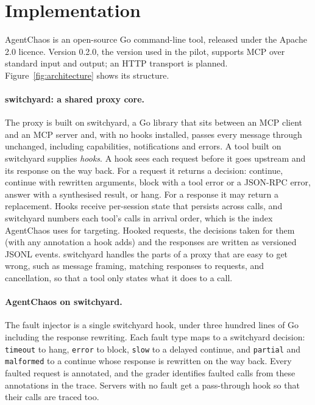\section{Implementation}\label{sec:implementation}

AgentChaos is an open-source Go command-line tool, released under the Apache 2.0 licence. Version 0.2.0, the version used in the pilot, supports MCP over standard input and output; an HTTP transport is planned. Figure~\ref{fig:architecture} shows its structure.



\paragraph{switchyard: a shared proxy core.} The proxy is built on switchyard, a Go library that sits between an MCP client and an MCP server and, with no hooks installed, passes every message through unchanged, including capabilities, notifications and errors. A tool built on switchyard supplies \emph{hooks}. A hook sees each request before it goes upstream and its response on the way back. For a request it returns a decision: continue, continue with rewritten arguments, block with a tool error or a JSON-RPC error, answer with a synthesised result, or hang. For a response it may return a replacement. Hooks receive per-session state that persists across calls, and switchyard numbers each tool's calls in arrival order, which is the index AgentChaos uses for targeting. Hooked requests, the decisions taken for them (with any annotation a hook adds) and the responses are written as versioned JSONL events. switchyard handles the parts of a proxy that are easy to get wrong, such as message framing, matching responses to requests, and cancellation, so that a tool only states what it does to a call.

\paragraph{AgentChaos on switchyard.} The fault injector is a single switchyard hook, under three hundred lines of Go including the response rewriting. Each fault type maps to a switchyard decision: \texttt{timeout} to hang, \texttt{error} to block, \texttt{slow} to a delayed continue, and \texttt{partial} and \texttt{malformed} to a continue whose response is rewritten on the way back. Every faulted request is annotated, and the grader identifies faulted calls from these annotations in the trace. Servers with no fault get a pass-through hook so that their calls are traced too.

